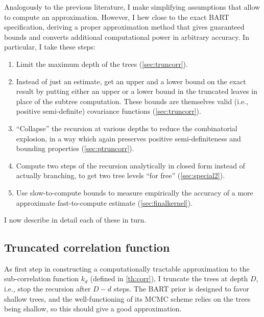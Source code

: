 \documentclass[a4paper]{article}
\theoremstyle{definition}
\begin{document}
    Analogously to the previous literature, I make simplifying assumptions that allow to compute an approximation. However, I hew close to the exact BART specification, deriving a proper approximation method that gives guaranteed bounds and converts additional computational power in arbitrary accuracy. In particular, I take these steps:
    \begin{enumerate}

        \item Limit the maximum depth of the trees (\autoref{sec:truncorr}).

        \item Instead of just an estimate, get an upper and a lower bound on the exact result by putting either an upper or a lower bound in the truncated leaves in place of the subtree computation. These bounds are themselves valid (i.e., positive semi-definite) covariance functions (\autoref{sec:truncorr}).

        \item ``Collapse'' the recursion at various depths to reduce the combinatorial explosion, in a way which again preserves positive semi-definiteness and bounding properties (\autoref{sec:ptruncorr}).

        \item Compute two steps of the recursion analytically in closed form instead of actually branching, to get two tree levels ``for free'' (\autoref{sec:special2}).

        \item Use slow-to-compute bounds to measure empirically the accuracy of a more approximate fast-to-compute estimate (\autoref{sec:finalkernel}).

    \end{enumerate}
    I now describe in detail each of these in turn.
    
    \subsection{Truncated correlation function}
    \label{sec:truncorr}
    
    As first step in constructing a computationally tractable approximation to the sub-correlation function $k_d$ (defined in \autoref{th:corr}), I truncate the trees at depth $D$, i.e., stop the recursion after $D-d$ steps. The BART prior is designed to favor shallow trees, and the well-functioning of its MCMC scheme relies on the trees being shallow, so this should give a good approximation.
\end{document}
